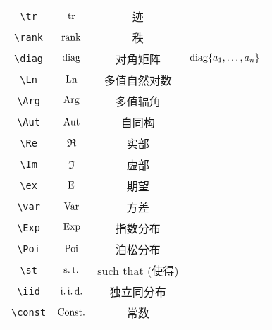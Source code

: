 \documentclass[lang=cn,12pt,scheme=chinese,mode=simple,black]{elegantbook}
\begin{document}
\begin{center}
\begin{tabular}{|c|c|c|c|}
        \verb|\tr|                 & $\operatorname{tr}$                 & 迹               &                                    \\
        \verb|\rank|               & $\operatorname{rank}$               & 秩               &                                    \\
        \verb|\diag|               & $\operatorname{diag}$               & 对角矩阵         & $\operatorname{diag}\{a_1,\dots,a_n\}$           \\
        \verb|\Ln|                 & $\mathop{\mathrm{Ln}}\nolimits$                 & 多值自然对数     &                                    \\
        \verb|\Arg|                & $\mathop{\mathrm{Arg}}\nolimits$                & 多值辐角         &                                    \\
        \verb|\Aut|                & $\mathop{\mathrm{Aut}}\nolimits$                & 自同构           &                                    \\
        \verb|\Re|                 & $\Re$                 & 实部             &                                    \\
        \verb|\Im|                 & $\Im$                 & 虚部             &                                    \\
        \verb|\ex|                 & $\operatorname{E}$                 & 期望             &                                    \\
        \verb|\var|                & $\operatorname{Var}$                & 方差             &                                    \\
        \verb|\Exp|                & $\operatorname{Exp}$                & 指数分布         &                                    \\
        \verb|\Poi|                & $\operatorname{Poi}$                & 泊松分布         &                                    \\
        \verb|\st|                 & $\operatorname{s.t.}$                 & such that (使得) &                                    \\
        \verb|\iid|                & $\operatorname{i.i.d.}$                & 独立同分布       &                                    \\
        \verb|\const|              & $\operatorname{Const.}$              & 常数             &                                    \\
        \hline
    \end{tabular}
\end{center}
\end{document}

